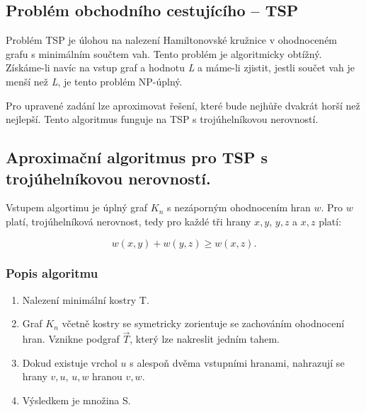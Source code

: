 \subsection{Problém obchodního cestujícího -- TSP}

Problém TSP je úlohou na nalezení Hamiltonovské kružnice v ohodnoceném grafu s minimálním součtem vah.
Tento problém je algoritmicky obtížný.
Získáme-li navíc na vstup graf a hodnotu \textit{L} a máme-li zjistit, jestli součet vah je menší než \textit{L}, je tento problém NP-úplný.

Pro upravené zadání lze aproximovat řešení, které bude nejhůře dvakrát horší než nejlepší.
Tento algoritmus funguje na TSP s trojúhelníkovou nerovností.

\subsection{Aproximační algoritmus pro TSP s trojúhelníkovou nerovností.}

Vstupem algortimu je úplný graf $K_n$ s nezáporným ohodnocením hran $w$.
Pro $w$ platí, trojúhelníková nerovnost, tedy pro každé tři hrany ${x, y}$, ${y, z}$ a ${x, z}$ platí:

$$
    w({x,y}) + w({y, z}) \geq w({x, z}).
$$


\subsubsection{Popis algoritmu}

\begin{enumerate}
    \item Nalezení minimální kostry T.
    \item Graf $K_n$ včetně kostry se symetricky zorientuje se zachováním ohodnocení hran.
    Vznikne podgraf $\vec{T}$, který lze nakreslit jedním tahem.
    \item Dokud existuje vrchol $u$ s alespoň dvěma vstupními hranami, nahrazují se hrany ${v, u}$, ${u, w}$ hranou ${v, w}$.
    \item Výsledkem je množina S.
\end{enumerate}


